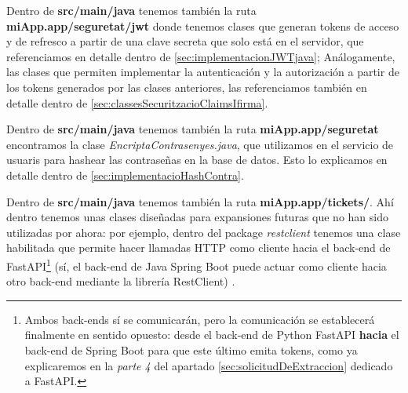 \documentclass[a4paper,12pt]{report}
\begin{document}
				
				
				Dentro de \textbf{src/main/java} tenemos también la ruta \textbf{miApp.app/seguretat/jwt} donde tenemos clases que generan tokens de acceso y de refresco  a partir de una clave secreta que solo está en el servidor, que referenciamos en detalle dentro de \ref{sec:implementacionJWTjava}; Análogamente, las clases que permiten implementar la autenticación y la autorización a partir de los tokens generados por las clases anteriores, las referenciamos también en detalle dentro de \ref{sec:classesSecuritzacioClaimsIfirma}.
				
				Dentro de \textbf{src/main/java} tenemos también la ruta \textbf{miApp.app/seguretat} encontramos la clase \textit{EncriptaContrasenyes.java}, que utilizamos en el servicio de usuaris para hashear las contraseñas en la base de datos. Esto lo explicamos en detalle dentro de \ref{sec:implementacioHashContra}.
				
				Dentro de \textbf{src/main/java} tenemos también la ruta \textbf{miApp.app/tickets/}. Ahí dentro tenemos unas clases diseñadas para expansiones futuras que no han sido utilizadas por ahora: por ejemplo, dentro del package \textit{restclient} tenemos una clase habilitada que permite hacer llamadas HTTP como cliente hacia el back-end de FastAPI\footnote{Ambos back-ends sí se comunicarán, pero la comunicación se establecerá finalmente en sentido opuesto: desde el back-end de Python FastAPI \textbf{hacia} el back-end de Spring Boot para que este último emita tokens, como ya explicaremos en la \textit{parte 4} del apartado \ref{sec:solicitudDeExtraccion} dedicado a FastAPI.} (sí, el back-end de Java Spring Boot puede actuar como cliente hacia otro back-end mediante la librería RestClient) . 
				
\end{document}
